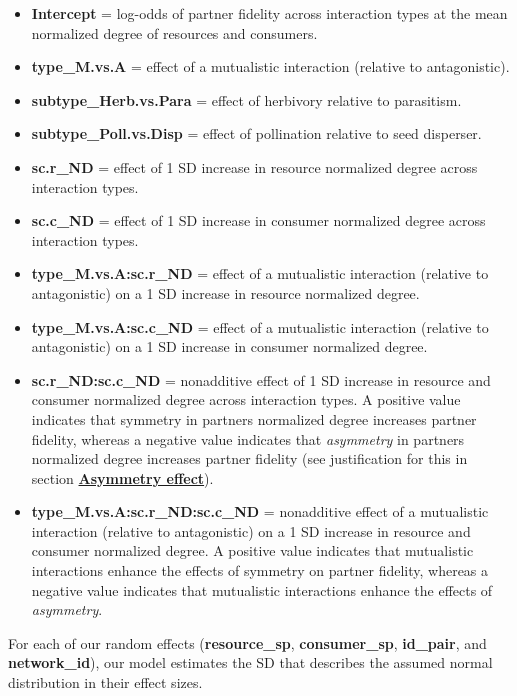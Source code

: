 \documentclass[11pt,]{article}
\providecommand{\tightlist}{%
  \setlength{\itemsep}{0pt}\setlength{\parskip}{0pt}}
\begin{document}
\begin{itemize}
\tightlist
\item
  \textbf{Intercept} = log-odds of partner fidelity across interaction
  types at the mean normalized degree of resources and consumers.
\item
  \textbf{type\_M.vs.A} = effect of a mutualistic interaction (relative
  to antagonistic).
\item
  \textbf{subtype\_Herb.vs.Para} = effect of herbivory relative to
  parasitism.
\item
  \textbf{subtype\_Poll.vs.Disp} = effect of pollination relative to
  seed disperser.
\item
  \textbf{sc.r\_ND} = effect of 1 SD increase in resource normalized
  degree across interaction types.
\item
  \textbf{sc.c\_ND} = effect of 1 SD increase in consumer normalized
  degree across interaction types.
\item
  \textbf{type\_M.vs.A:sc.r\_ND} = effect of a mutualistic interaction
  (relative to antagonistic) on a 1 SD increase in resource normalized
  degree.
\item
  \textbf{type\_M.vs.A:sc.c\_ND} = effect of a mutualistic interaction
  (relative to antagonistic) on a 1 SD increase in consumer normalized
  degree.
\item
  \textbf{sc.r\_ND:sc.c\_ND} = nonadditive effect of 1 SD increase in
  resource and consumer normalized degree across interaction types. A
  positive value indicates that symmetry in partners normalized degree
  increases partner fidelity, whereas a negative value indicates that
  \emph{asymmetry} in partners normalized degree increases partner
  fidelity (see justification for this in section
  \protect\hyperlink{asymmetry-effect}{\textbf{Asymmetry effect}}).
\item
  \textbf{type\_M.vs.A:sc.r\_ND:sc.c\_ND} = nonadditive effect of a
  mutualistic interaction (relative to antagonistic) on a 1 SD increase
  in resource and consumer normalized degree. A positive value indicates
  that mutualistic interactions enhance the effects of symmetry on
  partner fidelity, whereas a negative value indicates that mutualistic
  interactions enhance the effects of \emph{asymmetry}.
\end{itemize}

For each of our random effects (\textbf{resource\_sp},
\textbf{consumer\_sp}, \textbf{id\_pair}, and \textbf{network\_id}), our
model estimates the SD that describes the assumed normal distribution in
their effect sizes.
\end{document}
